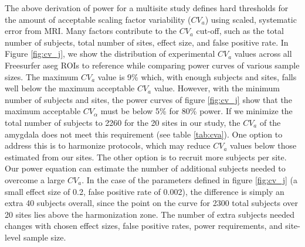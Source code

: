 The above derivation of power for a multisite study defines hard thresholds for the amount of acceptable scaling factor variability ($CV_{a}$) using scaled, systematic error from MRI. Many factors contribute to the $CV_{a}$ cut-off, such as the total number of subjects, total number of sites, effect size, and false positive rate. In Figure \ref{fig:cv_j}, we show the distribution of experimental $CV_{a}$ values across all Freesurfer aseg ROIs to reference while comparing power curves of various sample sizes. The maximum $CV_{a}$ value is 9\% which, with enough subjects and sites, falls well below the maximum acceptable $CV_{a}$ value. However, with the minimum number of subjects and sites, the power curves of figure \ref{fig:cv_j} show that the maximum acceptable $CV_{\alpha}$ must be below 5\% for 80\% power. If we minimize the total number of subjects to 2260 for the 20 sites in our study, the $CV_{a}$ of the amygdala does not meet this requirement (see table \ref{tab:cva}). One option to address this is to harmonize protocols, which may reduce $CV_a$ values below those estimated from our sites. The other option is to recruit more subjects per site. Our power equation can estimate the number of additional subjects needed to overcome a large $CV_a$. In the case of the parameters defined in figure \ref{fig:cv_j} (a small effect size of 0.2, false positive rate of 0.002), the difference is simply an extra 40 subjects overall, since the point on the curve for 2300 total subjects over 20 sites lies above the harmonization zone. The number of extra subjects needed changes with chosen effect sizes, false positive rates, power requirements, and site-level sample size. 

